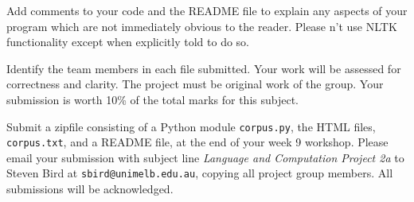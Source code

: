 \documentclass[a4paper,11pt]{article}
\begin{document}
Add comments to your code and the README file to explain any aspects of your
program which are not immediately obvious to the reader.  Please n't use NLTK
functionality except when explicitly told to do so.

Identify the team members in each file submitted.
Your work will be assessed for correctness and clarity.
The project must be original work of the group.
Your submission is worth 10\% of the total marks for this subject.

Submit a zipfile consisting of a Python module \verb|corpus.py|,
the HTML files, \verb|corpus.txt|, and a README file, at the end of your week
9 workshop. Please email your submission with subject line
\textit{Language and Computation Project 2a}
to Steven Bird at \texttt{sbird@unimelb.edu.au},
copying all project group members.  All submissions
will be acknowledged.
\end{document}
